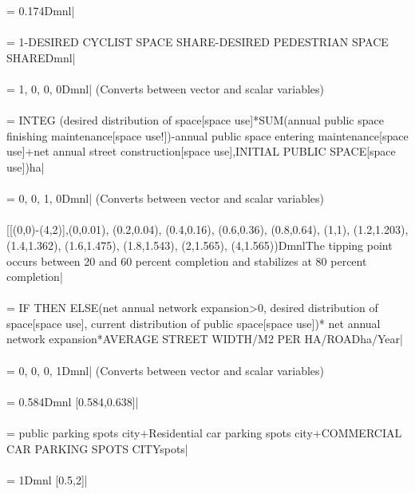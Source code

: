  = 0.174Dmnl| \\ \\ 
 = 1-DESIRED CYCLIST SPACE SHARE-DESIRED PEDESTRIAN SPACE SHAREDmnl| \\ \\ 
 = 1, 0, 0, 0Dmnl| (Converts between vector and scalar variables) \\ \\ 
 =  INTEG (desired distribution of space[space use]*SUM(annual public space finishing maintenance[space use!])-annual public space entering maintenance[space use]+net annual street construction[space use],INITIAL PUBLIC SPACE[space use])ha| \\ \\ 
 = 0, 0, 1, 0Dmnl| (Converts between vector and scalar variables) \\ \\ 
 [[(0,0)-(4,2)],(0,0.01), (0.2,0.04), (0.4,0.16), (0.6,0.36), (0.8,0.64), (1,1), (1.2,1.203),(1.4,1.362), (1.6,1.475), (1.8,1.543), (2,1.565), (4,1.565))DmnlThe tipping point occurs between 20 and 60 percent completion and stabilizes at 80 percent completion| \\ \\ 
 = IF THEN ELSE(net annual network expansion>0, desired distribution of space[space use], current distribution of public space[space use])* net annual network expansion*AVERAGE STREET WIDTH/M2 PER HA/ROADha/Year| \\ \\ 
 = 0, 0, 0, 1Dmnl| (Converts between vector and scalar variables) \\ \\ 
 = 0.584Dmnl [0.584,0.638]| \\ \\ 
 = public parking spots city+Residential car parking spots city+COMMERCIAL CAR PARKING SPOTS CITYspots| \\ \\ 
 = 1Dmnl [0.5,2]| \\ \\ 

